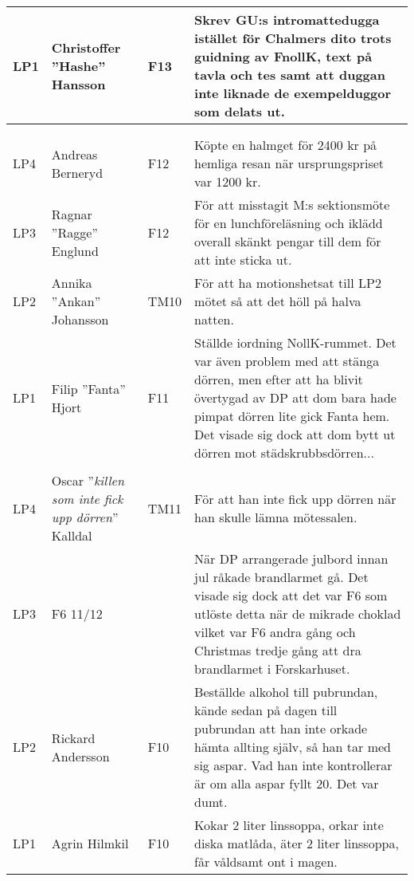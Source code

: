 \documentclass[a4paper]{article}
\begin{document}
\begin{longtable}{p{5mm}>{\raggedright\arraybackslash}p{30mm}p{10mm}p{108mm}}
LP1 & Christoffer ''Hashe'' Hansson & F13 & Skrev GU:s intromattedugga istället för Chalmers dito trots guidning av FnollK, text på tavla och tes samt att duggan inte liknade de exempelduggor som delats ut.\\ \hline
\\
\hline
\rowcolor{veryLightGray} \multicolumn{4}{l}{\textbf{2012/2013}} \\ \hline

LP4 & Andreas Berneryd & F12 & Köpte en halmget för 2400 kr på hemliga resan när ursprungspriset var 1200 kr. \\ \hline

LP3 & Ragnar ''Ragge'' Englund & F12 & För att misstagit M:s sektionsmöte för en lunchföreläsning och iklädd overall skänkt pengar till dem för att inte sticka ut. \\ \hline

LP2 & Annika ''Ankan'' Johansson & TM10 & För att ha motionshetsat till LP2 mötet så att det höll på halva natten.  \\ \hline

LP1 & Filip ''Fanta'' Hjort & F11 & Ställde  iordning NollK-rummet. Det var även problem med att stänga dörren, men efter att ha blivit övertygad av DP att dom bara hade pimpat dörren lite gick Fanta hem. Det visade sig dock att dom bytt ut dörren mot städskrubbsdörren...\\ \hline

\rowcolor{veryLightGray} \multicolumn{4}{l}{\textbf{2011/2012}} \\ \hline

LP4 & Oscar ''\emph{killen som inte fick upp dörren}'' Kalldal & TM11 & För att han inte fick upp dörren när han skulle lämna mötessalen. \\ \hline

LP3 & F6 11/12 &  & När DP arrangerade julbord innan jul råkade brandlarmet gå. Det visade sig dock att det var F6 som utlöste detta när de mikrade choklad vilket var F6 andra gång och Christmas tredje gång att dra brandlarmet i Forskarhuset. \\ \hline

LP2 & Rickard Andersson & F10 & Beställde alkohol till pubrundan, kände sedan på dagen till pubrundan att han inte orkade hämta allting själv, så han tar med sig aspar. Vad han inte kontrollerar är om alla aspar fyllt 20. Det var dumt. \\ \hline

LP1 & Agrin Hilmkil & F10 & Kokar 2 liter linssoppa, orkar inte diska matlåda, äter 2 liter linssoppa, får
våldsamt ont i magen. \\ \hline


\end{longtable}
\end{document}
